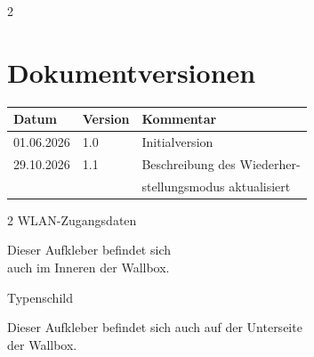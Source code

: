 \documentclass[a4paper,10pt]{article}
\begin{document}
\begin{multicols*}{2}
    \section{Dokumentversionen}
    \begin{tabular}{lll}
        \toprule
        Datum      & Version\hspace{-0.2pt} & Kommentar        \\
        \midrule
        01.06.2026 & 1.0     & Initialversion                  \\
        29.10.2026 & 1.1     & Beschreibung des Wiederher-\\
                   &         & stellungsmodus aktualisiert \\
        \bottomrule
    \end{tabular}


\end{multicols*}

\appendix
   \newpage

	\pagecolor{covergray}\afterpage{\nopagecolor}

   \begin{multicols*}{2}
    \pagestyle{empty}
    \null
    \vfill
	\color{white}
    WLAN-Zugangsdaten
    \begin{tcolorbox}[width=4.2cm,height=2.7cm, boxrule=0.25mm]

    \end{tcolorbox}
    Dieser Aufkleber befindet sich\\ auch im Inneren der Wallbox.
    \columnbreak

    \null
    \vfill
    Typenschild
    \begin{tcolorbox}[width=7.8cm,height=4.1cm, boxrule=0.25mm]

    \end{tcolorbox}
    Dieser Aufkleber befindet sich auch auf der Unterseite\\ der Wallbox.
\end{multicols*}
\end{document}
